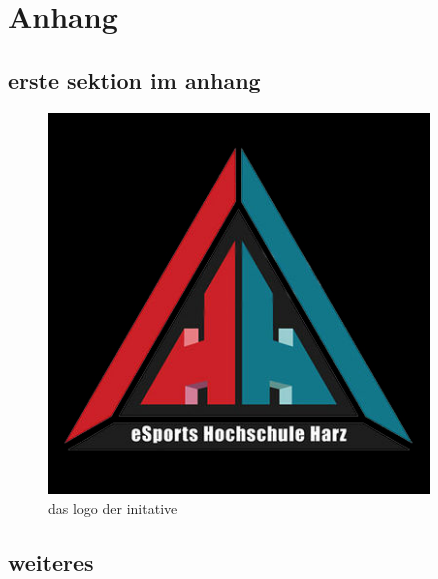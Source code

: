 \appendix

\section*{Anhang}

\renewcommand{\thesubsection}{\Alph{subsection}}
\renewcommand{\thefigure}{\thesubsection.\arabic{figure}}
\setcounter{figure}{0}

\subsection{erste sektion im anhang}


    \begin{figure}[H]
        \centering
        \includegraphics[width=0.9\textwidth]{graphics/logo black.jpg}
        \caption[logo]{das logo der initative}
        \label{fig:appendix_logo}
    \end{figure}


\setcounter{figure}{0}
\subsection{weiteres}

